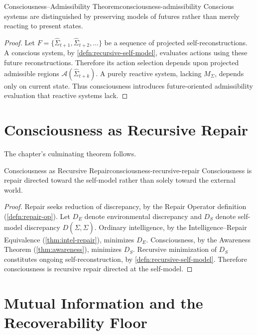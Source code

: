 \documentclass[12pt,twoside,openright]{book}
\newcommand{\adm}{\mathcal{A}}
\begin{document}
\begin{theorem}{Consciousness--Admissibility Theorem}{consciousness-admissibility}
  Conscious systems are distinguished by preserving models
  of futures rather than merely reacting to present states.
\end{theorem}

\begin{proof}
  Let $F = \{\hat{\Sigma}_{t+1}, \hat{\Sigma}_{t+2}, \ldots\}$
  be a sequence of projected self-reconstructions. A
  conscious system, by \cref{defn:recursive-self-model},
  evaluates actions using these future reconstructions.
  Therefore its action selection depends upon projected
  admissible regions $\adm(\hat{\Sigma}_{t+k})$. A purely
  reactive system, lacking $M_\Sigma$, depends only on
  current state. Thus consciousness introduces
  future-oriented admissibility evaluation that reactive
  systems lack.
\end{proof}

\section{Consciousness as Recursive Repair}
\label{sec:ch21-recursive-repair}

The chapter's culminating theorem follows.

\begin{theorem}{Consciousness as Recursive Repair}{consciousness-recursive-repair}
  Consciousness is repair directed toward the self-model
  rather than solely toward the external world.
\end{theorem}

\begin{proof}
  Repair seeks reduction of discrepancy, by the Repair
  Operator definition (\cref{defn:repair-op}). Let $D_E$
  denote environmental discrepancy and $D_S$ denote
  self-model discrepancy $D(\Sigma, \hat{\Sigma})$. Ordinary
  intelligence, by the Intelligence--Repair Equivalence
  (\cref{thm:intel-repair}), minimizes $D_E$. Consciousness,
  by the Awareness Theorem (\cref{thm:awareness}), minimizes
  $D_S$. Recursive minimization of $D_S$ constitutes
  ongoing self-reconstruction, by
  \cref{defn:recursive-self-model}. Therefore consciousness
  is recursive repair directed at the self-model.
\end{proof}

\section{Mutual Information and the Recoverability Floor}
\label{sec:ch21-mutual-info}
\end{document}
